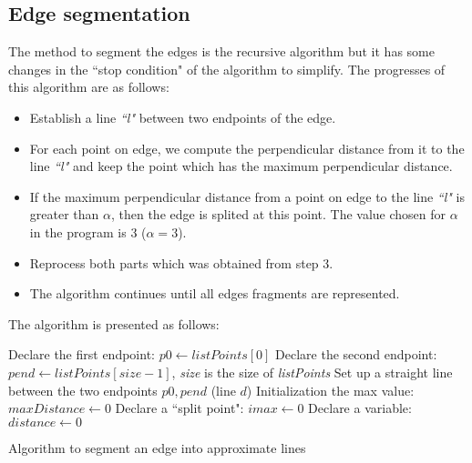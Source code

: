 \subsection{Edge segmentation}
The method to segment the edges is the recursive algorithm\cite{thacker1995assessing} but it has some changes in the ``stop condition" of the algorithm to simplify. The progresses of this algorithm are as follows:
\begin{itemize}
\item Establish a line \textit{``l"} between two endpoints of the edge.
\item For each point on edge, we compute the perpendicular distance from it to the line \textit{``l"} and keep the point which has the maximum perpendicular distance.
\item If the maximum perpendicular distance from a point on edge to the line \textit{``l"} is greater than $\alpha$, then the edge is splited at this point. The value chosen for $\alpha$ in the program is 3 ($\alpha = 3$).
\item Reprocess both parts which was obtained from step 3.
\item The algorithm continues until all edges fragments are represented.
\end{itemize}
The algorithm is presented as follows:\\
\IncMargin{1em}
\begin{algorithm}[H]
\Indm 
{}
\SetAlgoLined
{}
\Indp
Declare the first endpoint: $p0 \leftarrow listPoints[0]$\;
Declare the second endpoint: $pend \leftarrow listPoints[size - 1]$, \textit{size} is the size of \textit{listPoints}\;
Set up a straight line between the two endpoints $p0, pend$ (line $d$)\;
Initialization the max value: $maxDistance  \leftarrow 0 $\;
Declare a ``split point": $imax \leftarrow 0$ \; 
Declare a variable: $distance \leftarrow 0$\;

\caption{Algorithm to segment an edge into approximate lines}
\end{algorithm}\DecMargin{1em}
